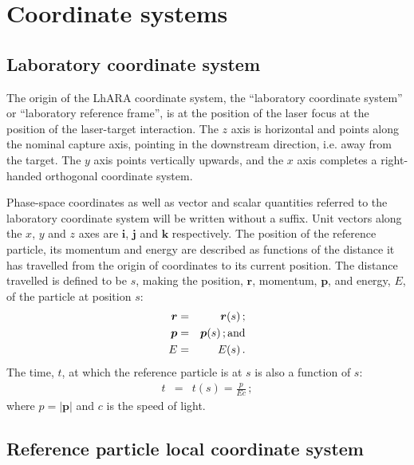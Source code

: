 \graphicspath{ {02-CoordinateSystems/Figures/} }

\section{Coordinate systems}

\subsection{Laboratory coordinate system}

The origin of the LhARA coordinate system, the ``laboratory coordinate
system'' or ``laboratory reference frame'', is at the position of the
laser focus at the position of the laser-target interaction.
The $z$ axis is horizontal and points along the nominal capture axis,
pointing in the downstream direction, i.e. away from the target.
The $y$ axis points vertically upwards, and the $x$ axis completes a
right-handed orthogonal coordinate system. 

Phase-space coordinates as well as vector and scalar quantities
referred to the laboratory coordinate system will be written without a
suffix. 
Unit vectors along the $x$, $y$ and $z$ axes are $\bm{i}$, $\bm{j}$
and $\bm{k}$ respectively.
The position of the reference particle, its momentum and energy are
described as functions of the distance it has travelled from the origin
of coordinates to its current position.
The distance travelled is defined to be $s$, making the position,
$\bm{r}$, momentum, $\bm{p}$, and energy, $E$, of the particle at
position $s$:
\begin{eqnarray}
  \bm{r} & = & \bm{r}(s)\, ;           \nonumber \\
  \bm{p} & = & \bm{p}(s)\, {\rm ; and} \nonumber \\
      E  & = &     E (s)\, .           \nonumber
\end{eqnarray}
The time, $t$, at which the reference particle is at $s$ is also a
function of $s$:
\begin{eqnarray}
      t  & = & t(s) = \frac{p}{Ec}\, ; \nonumber
\end{eqnarray}
where $p=\left|\bm{p}\right|$ and $c$ is the speed of light.

\subsection{Reference particle local coordinate system}

